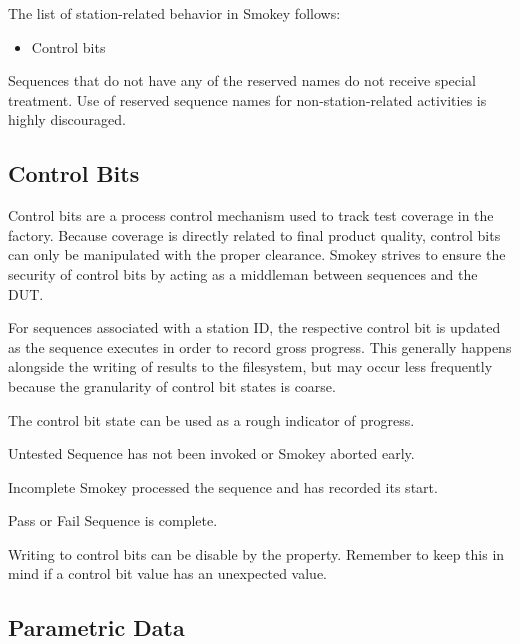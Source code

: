 The list of station-related behavior in Smokey follows:

\begin{itemize}

	\item Control bits

\end{itemize}

Sequences that do not have any of the reserved names do not receive special
treatment.  Use of reserved sequence names for non-station-related activities
is highly discouraged.

\subsection{Control Bits}

Control bits are a process control mechanism used to track test coverage in the
factory.  Because coverage is directly related to final product quality,
control bits can only be manipulated with the proper clearance.  Smokey strives
to ensure the security of control bits by acting as a middleman between
sequences and the DUT.

For sequences associated with a station ID, the respective control bit is
updated as the sequence executes in order to record gross progress.  This
generally happens alongside the writing of results to the filesystem, but may
occur less frequently because the granularity of control bit states is coarse.

The control bit state can be used as a rough indicator of progress.

\begin{Definition}

	\item[Untested] Sequence has not been invoked or Smokey aborted early.

	\item[Incomplete] Smokey processed the sequence and has recorded its
	start.

	\item[Pass \textnormal{or} Fail] Sequence is complete.

\end{Definition}

Writing to control bits can be disable by the  property.
Remember to keep this in mind if a control bit value has an unexpected value.

\subsection{Parametric Data}
\label{sec:ParametricData}

